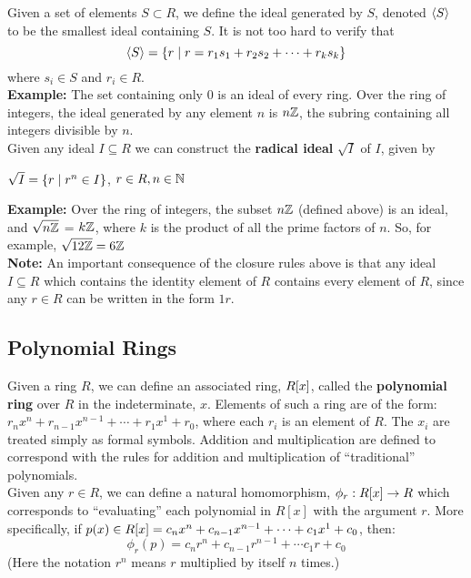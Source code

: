 \documentclass[twoside]{report}
\begin{document}
Given a set of elements $S \subset R$, we define the ideal generated
by $S$, denoted $\langle S\rangle$ to be the smallest ideal containing $S$.  It is
not too hard to verify that 
$$\langle S\rangle = \{r \mid r = r_1s_1 + r_2s_2 + \cdots + r_ks_k\}$$ 
where $s_i \in S$ and $r_i \in R$.\\

\textbf{Example:} The set containing only $0$ is an ideal of every
ring.  Over the ring of integers, the ideal generated by any element
$n$ is $n\mathbb{Z}$, the subring containing all integers
divisible by $n$. \\

Given any ideal $I \subseteq R$ we can construct the \textbf{radical
  ideal} $\sqrt{I}$ of $I$, given by\\

\centerline{$\sqrt{I} = \{r \mid r^n \in I\}$, $r \in R, n \in
  \mathbb{N}$} \vspace{\baselineskip}

\textbf{Example:} Over the ring of integers, the subset $n\mathbb{Z}$
(defined above) is an ideal, and $\sqrt{n\mathbb{Z}}$ = $k\mathbb{Z}$,
where $k$ is the product of all the prime factors of
$n$.  So, for example, $\sqrt{12\mathbb{Z}} = 6\mathbb{Z}$\\

\textbf{Note:} An important consequence of the closure rules above is
that any ideal $I \subseteq R$ which contains the identity element of
$R$ contains every element of $R$, since any $r \in R$ can be written
in the form $1r$.

\subsection{Polynomial Rings}

Given a ring $R$, we can define an associated ring, $R[x]$, called
the \textbf{polynomial ring} over $R$ in the indeterminate, $x$.
Elements of such a ring are of the form: $r_nx^n + r_{n-1}x^{n-1} +
\cdots + r_1x^1 + r_0$, where each $r_i$ is an element of $R$.  The
$x_i$ are treated simply as formal symbols. Addition and
multiplication are defined to correspond with the rules for addition
and multiplication of ``traditional'' polynomials. \\

Given any $r \in R$, we can define a natural homomorphism, $\phi_r:
R[x] \rightarrow R$ which corresponds to ``evaluating'' each
polynomial in $R[x]$ with the argument $r$.  More specifically, if
$p(x) \in R[x] = c_nx^n + c_{n-1}x^{n-1} + \cdots + c_1x^1 + c_0$,
then:
$$\phi_r(p) = c_nr^n + c_{n-1}r^{n-1} + \cdots c_1r + c_0$$  
(Here the notation $r^n$ means $r$ multiplied by itself $n$ times.)\\
\end{document}
